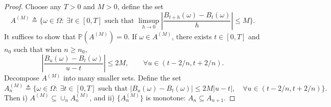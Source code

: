 \begin{proof}
Choose any $T>0$ and $M>0$, define the set
\[
A^{(M)}\triangleq \bigg\{
\omega\in\Omega:~\exists t\in[0,T]\text{ such that }\limsup\limits_{h\to0}\left|
\frac{B_{t+h}(\omega) - B_t(\omega)}{h}
\right|\le M
\bigg\}.
\]
It suffices to show that $\mathbb{P}(A^{(M)})=0$.
If $\omega\in A^{(M)}$, there exists $t\in[0,T]$ and $n_0$ such that when $n\ge n_0$,
\[
\left|
\frac{B_{u}(\omega) - B_t(\omega)}{u-t}
\right|\le 2M,\qquad \forall u\in(t-2/n,t+2/n).
\]
Decompose $A^{(M)}$ into many smaller sets.
Define the set
\begin{equation}\label{Eq:7:1}
A^{(M)}_n\triangleq \bigg\{
\omega\in\Omega:~\exists t\in[0,T]\text{ such that }
|B_u(\omega) - B_t(\omega)|\le 2M|u-t|,\quad
\forall u\in(t-2/n,t+2/n)
\bigg\}. 
\end{equation}
Then i) $A^{(M)}\subseteq \cup_nA_n^{(M)}$, and ii) $\{A^{(M)}_n\}$ is monotone: $A_n\subseteq A_{n+1}$.


\end{proof}

